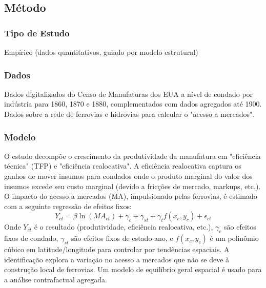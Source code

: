 \documentclass[12pt]{article}
\begin{document}
\subsection*{Método}

\subsubsection*{Tipo de Estudo}
Empírico (dados quantitativos, guiado por modelo estrutural)

\subsubsection*{Dados}
Dados digitalizados do Censo de Manufaturas dos EUA a nível de condado por indústria para 1860, 1870 e 1880, complementados com dados agregados até 1900. Dados sobre a rede de ferrovias e hidrovias para calcular o "acesso a mercados".

\subsubsection*{Modelo}
O estudo decompõe o crescimento da produtividade da manufatura em "eficiência técnica" (TFP) e "eficiência realocativa". A eficiência realocativa captura os ganhos de mover insumos para condados onde o produto marginal do valor dos insumos excede seu custo marginal (devido a fricções de mercado, markups, etc.). O impacto do acesso a mercados (MA), impulsionado pelas ferrovias, é estimado com a seguinte regressão de efeitos fixos:
\begin{equation*}
Y_{ct} = \beta \ln(MA_{ct}) + \gamma_c + \gamma_{st} + \gamma_t f(x_c, y_c) + \epsilon_{ct}
\end{equation*}
Onde $Y_{ct}$ é o resultado (produtividade, eficiência realocativa, etc.), $\gamma_c$ são efeitos fixos de condado, $\gamma_{st}$ são efeitos fixos de estado-ano, e $f(x_c, y_c)$ é um polinômio cúbico em latitude/longitude para controlar por tendências espaciais. A identificação explora a variação no acesso a mercados que não se deve à construção local de ferrovias. Um modelo de equilíbrio geral espacial é usado para a análise contrafactual agregada.
\end{document}
